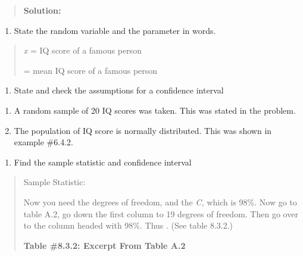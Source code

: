 \documentclass[]{book}
\providecommand{\tightlist}{%
  \setlength{\itemsep}{0pt}\setlength{\parskip}{0pt}}
\begin{document}
\begin{quote}
\textbf{Solution:}
\end{quote}

\begin{enumerate}
\def\labelenumi{\arabic{enumi}.}
\tightlist
\item
  State the random variable and the parameter in words.
\end{enumerate}

\begin{quote}
\emph{x} = IQ score of a famous person

= mean IQ score of a famous person
\end{quote}

\begin{enumerate}
\def\labelenumi{\arabic{enumi}.}
\setcounter{enumi}{1}
\tightlist
\item
  State and check the assumptions for a confidence interval
\end{enumerate}

\begin{enumerate}
\def\labelenumi{\alph{enumi}.}
\item
  A random sample of 20 IQ scores was taken. This was stated in the
  problem.
\item
  The population of IQ score is normally distributed. This was shown
  in example \#6.4.2.
\end{enumerate}

\begin{enumerate}
\def\labelenumi{\arabic{enumi}.}
\setcounter{enumi}{2}
\tightlist
\item
  Find the sample statistic and confidence interval
\end{enumerate}

\begin{quote}
Sample Statistic:

Now you need the degrees of freedom, and the \emph{C,} which is 98\%. Now go
to table A.2, go down the first column to 19 degrees of freedom. Then
go over to the column headed with 98\%. Thus . (See table 8.3.2.)

\textbf{Table \#8.3.2: Excerpt From Table A.2}
\end{quote}
\end{document}

